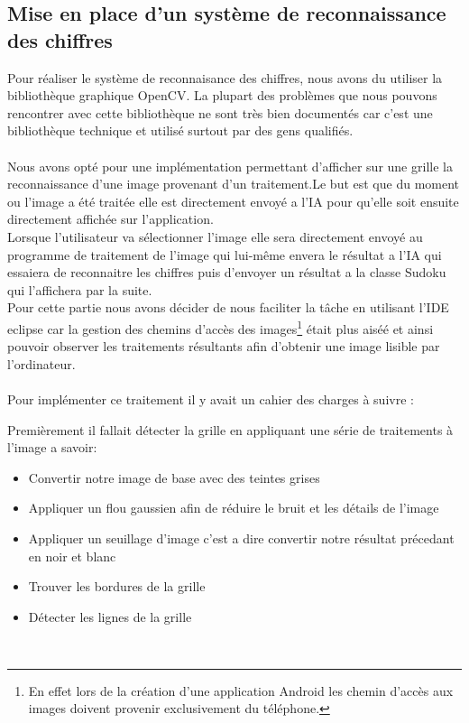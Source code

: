 \documentclass{article}
\begin{document}
\subsection{Mise en place d'un système de reconnaissance des chiffres}
Pour réaliser le système de reconnaisance des chiffres, nous avons du utiliser la bibliothèque graphique OpenCV.
La plupart des problèmes que nous pouvons rencontrer avec cette bibliothèque ne sont très bien documentés car c'est une bibliothèque technique et utilisé surtout par des gens qualifiés.\\\\
Nous avons opté pour une implémentation permettant d'afficher sur une grille la reconnaissance d'une image provenant d'un traitement.Le but est que du moment ou l'image a été traitée elle est directement envoyé a l'IA pour qu'elle soit ensuite directement affichée sur l'application.\\

Lorsque l'utilisateur va sélectionner l'image elle sera directement envoyé au programme de traitement de l'image qui lui-même envera le résultat a l'IA qui essaiera de reconnaitre les chiffres puis d'envoyer un résultat a la classe Sudoku qui l'affichera par la suite.\\

Pour cette partie nous avons décider de nous faciliter la tâche en utilisant l'IDE eclipse car la gestion des chemins d'accès des images\footnote{En effet lors de la création d'une application Android les chemin d'accès aux images doivent provenir exclusivement du téléphone.} était plus aiséé et ainsi pouvoir observer les traitements résultants afin d'obtenir une image lisible par l'ordinateur.\\
\\

Pour implémenter ce traitement il y avait un cahier des charges à suivre :

Premièrement il fallait détecter la grille en appliquant une série de traitements à l'image a savoir:
\begin{itemize}
    \item Convertir notre image de base avec des teintes grises
    \item Appliquer un flou gaussien afin de réduire le bruit et les détails de l'image
    \item Appliquer un seuillage d'image c'est a dire convertir notre résultat précedant en noir et blanc
    \item Trouver les bordures de la grille
    \item Détecter les lignes de la grille
\end{itemize}\\
\end{document}
